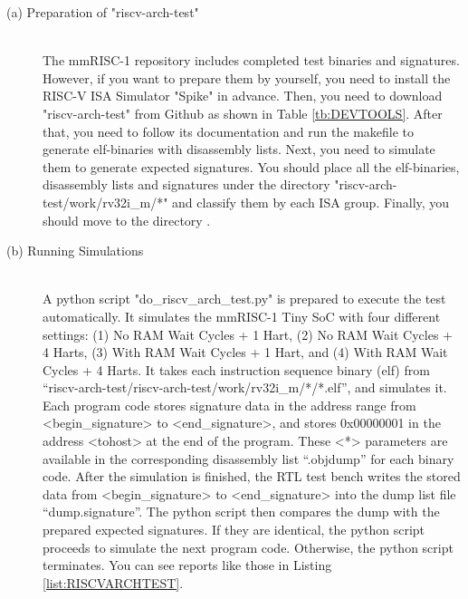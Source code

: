 \begin{description}

    \item[(a) Preparation of "riscv-arch-test"]\mbox{}\\
The mmRISC-1 repository includes completed test binaries and signatures. However, if you want to prepare them by yourself, you need to install the RISC-V ISA Simulator "Spike" in advance. Then, you need to download "riscv-arch-test" from Github as shown in Table \ref{tb:DEVTOOLS}. After that, you need to follow its documentation and run the makefile to generate elf-binaries with disassembly lists. Next, you need to simulate them to generate expected signatures. You should place all the elf-binaries, disassembly lists and signatures under the directory "riscv-arch-test/work/rv32i\_m/*" and classify them by each ISA group. Finally, you should move to the directory .   

    \item[(b) Running Simulations]\mbox{}\\
A python script "do\_riscv\_arch\_test.py" is prepared to execute the test automatically. It simulates the mmRISC-1 Tiny SoC with four different settings: (1) No RAM Wait Cycles + 1 Hart, (2) No RAM Wait Cycles + 4 Harts, (3) With RAM Wait Cycles + 1 Hart, and (4) With RAM Wait Cycles + 4 Harts. It takes each instruction sequence binary (elf) from “riscv-arch-test/riscv-arch-test/work/rv32i\_m/*/*.elf”, and simulates it. Each program code stores signature data in the address range from <begin\_signature> to <end\_signature>, and stores 0x00000001 in the address <tohost> at the end of the program. These <*> parameters are available in the corresponding disassembly list “.objdump” for each binary code. After the simulation is finished, the RTL test bench writes the stored data from <begin\_signature> to <end\_signature> into the dump list file “dump.signature”. The python script then compares the dump with the prepared expected signatures. If they are identical, the python script proceeds to simulate the next program code. Otherwise, the python script terminates. You can see reports like those in Listing \ref{list:RISCVARCHTEST}.

\end{description}

